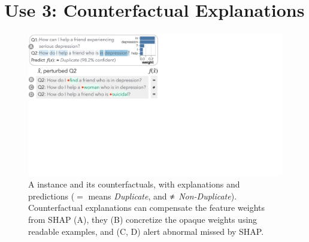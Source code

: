 
\newcommand{\fwone}[1]{\colbox{cfwone}{#1}\xspace}
\newcommand{\fwtwo}[1]{\colbox{cfwtwo}{#1}\xspace}
\newcommand{\fwthree}[1]{\colbox{cfwthree}{#1}\xspace}
\newcommand{\fwfour}[1]{\colbox{cfwfour}{#1}\xspace}

\newcommand{\fexp}[2]{\texttt{[{\color{darkgray}{#1:#2}}]}\xspace}
\newcommand{\fexptag}[1]{\fexp{TAG}{#1}}
\newcommand{\fexpfrom}[1]{\fexp{FROM}{#1}}
\newcommand{\fexpto}[1]{\fexp{TO}{#1}}
\newcommand{\fexptemp}[1]{\fexp{TEMP}{#1}}


\section{Use 3: Counterfactual Explanations}
\label{sec:app_explain}







\begin{figure}[t]
\centering
\includegraphics[trim={0 20cm 33cm 0cm},clip,width=1\columnwidth]{figures/explanation_v2}
\vspace{-15pt}
\caption{
A \qqp instance and its counterfactuals, with explanations and predictions ($\mathbf{=}$ means \emph{Duplicate}, and $\mathbf{\not\eq}$ \emph{Non-Duplicate}).
Counterfactual explanations can compensate the feature weights from SHAP (A), \ie they (B) concretize the opaque weights using readable examples, and (C, D) alert abnormal missed by SHAP.
}
\vspace{-10pt}
\label{fig:explanation}
\end{figure}

